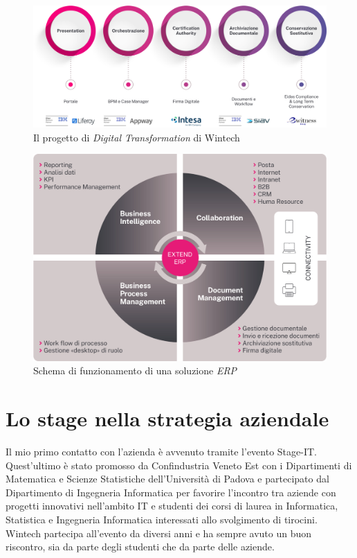 \begin{figure}[!htbp]
    \centering
    \includegraphics[width=\linewidth]{images/wtc/digital-transform.png}
    \caption{Il progetto di \emph{Digital Transformation} di Wintech}
    \label{fig:digital-transformation}
\end{figure}

\begin{figure}[!htbp]
    \centering
    \includegraphics[width=0.8\linewidth]{images/wtc/erp.jpg}
    \caption{Schema di funzionamento di una soluzione \emph{ERP}}
    \label{fig:erp-schema}
\end{figure}

\section{Lo stage nella strategia aziendale}

Il mio primo contatto con l'azienda è avvenuto tramite l'evento Stage-IT. Quest'ultimo è stato promosso da Confindustria Veneto Est con i Dipartimenti di Matematica e Scienze Statistiche dell'Università di Padova e partecipato dal Dipartimento di Ingegneria Informatica per favorire l'incontro tra aziende con progetti innovativi nell'ambito IT e studenti dei corsi di laurea in Informatica, Statistica e Ingegneria Informatica interessati allo svolgimento di tirocini. Wintech partecipa all'evento da diversi anni e ha sempre avuto un buon riscontro, sia da parte degli studenti che da parte delle aziende.

